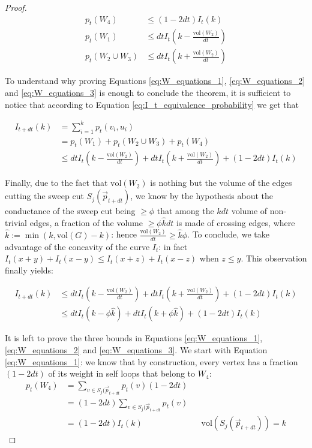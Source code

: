 \documentclass[../main.tex]{subfiles}
\begin{document}
\begin{proof}
    \begin{align}
        p_t(W_4) & \leq (1-2dt)I_t(k) \label{eq:W_equations_1}\\
        p_t(W_1) & \leq dt I_t\left(k - \frac{\text{vol}(W_2)}{dt}\right) \label{eq:W_equations_2} \\
        p_t(W_2 \cup W_3) & \leq  dt I_t\left(k + \frac{\text{vol}(W_2)}{dt}\right) \label{eq:W_equations_3}
    \end{align}
    
    To understand why proving Equations \ref{eq:W_equations_1}, \ref{eq:W_equations_2} and \ref{eq:W_equations_3} is enough to conclude the theorem, it is sufficient to notice that according to Equation \ref{eq:I_t_equivalence_probability} we get that
    
    \begin{align}
        I_{t+dt}(k) & = \sum_{i=1}^{k} p_t(v_i, u_i) \\ 
        & = p_t(W_1) + p_t(W_2 \cup W_3) + p_t(W_4) \\
        & \leq dt I_t\left(k - \frac{\text{vol}(W_2)}{dt}\right) + dtI_t\left(k + \frac{\text{vol}(W_2)}{dt}\right) + (1 - 2dt) I_t(k)
    \end{align}
    
    Finally, due to the fact that $\text{vol}(W_2)$ is nothing but the volume of the edges cutting the sweep cut $S_j(\vec{p}_{t+dt})$, we know by the hypothesis about the conductance of the sweep cut being $\geq \phi$ that among the $k dt$ volume of non-trivial edges, a fraction of the volume $\geq \phi \hat{k} dt$ is made of crossing edges, where $\hat{k}:= \min(k, \text{vol}(G) - k)$: hence $\frac{\text{vol}(W_2)}{dt} \geq \hat{k} \phi$. To conclude, we take advantage of the concavity of the curve $I_t$: in fact $I_t(x + y) + I_t(x - y) \leq I_t(x + z) + I_t(x - z)$ when $z \leq y$. This observation finally yields:
    
    \begin{align}
        I_{t+dt}(k) & \leq dt I_t\left(k - \frac{\text{vol}(W_2)}{dt}\right) + dtI_t\left(k + \frac{\text{vol}(W_2)}{dt}\right) + (1 - 2dt) I_t(k) \\ 
        & \leq dt I_t\left(k - \phi \hat{k}\right) + dtI_t\left(k + \phi \hat{k}\right) + (1 - 2dt) I_t(k)
    \end{align}
    
    It is left to prove the three bounds in Equations \ref{eq:W_equations_1}, \ref{eq:W_equations_2} and \ref{eq:W_equations_3}. We start with Equation \ref{eq:W_equations_1}: we know that by construction, every vertex has a fraction $(1-2dt)$ of its weight in self loops that belong to $W_4$: 
    \begin{align}
        p_t(W_4) & = \sum_{v\in S_j(\vec{p}_{t+dt}} p_t(v) (1-2dt) \\
        & = (1-2dt) \sum_{v\in S_j(\vec{p}_{t+dt}} p_t(v) \\
        & = (1-2dt) I_t(k) && \text{vol}(S_j(\vec{p}_{t+dt})) = k
    \end{align}
    

\end{proof}
\end{document}
